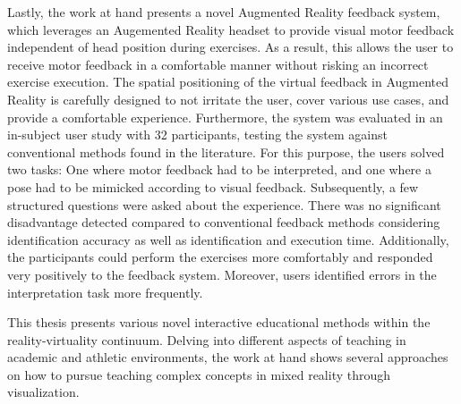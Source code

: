Lastly, the work at hand presents a novel Augmented Reality feedback system, which leverages an Augemented Reality headset to provide visual motor feedback independent of head position during exercises.
As a result, this allows the user to receive motor feedback in a comfortable manner without risking an incorrect exercise execution.
The spatial positioning of the virtual feedback in Augmented Reality is carefully designed to not irritate the user, cover various use cases, and provide a comfortable experience.
Furthermore, the system was evaluated in an in-subject user study with 32 participants, testing the system against conventional methods found in the literature.
For this purpose, the users solved two tasks: One where motor feedback had to be interpreted, and one where a pose had to be mimicked according to visual feedback.
Subsequently, a few structured questions were asked about the experience.
There was no significant disadvantage detected compared to conventional feedback methods considering identification accuracy as well as identification and execution time.
Additionally, the participants could perform the exercises more comfortably and responded very positively to the feedback system.
Moreover, users identified errors in the interpretation task more frequently.

This thesis presents various novel interactive educational methods within the reality-virtuality continuum.
Delving into different aspects of teaching in academic and athletic environments, the work at hand shows several approaches on how to pursue teaching complex concepts in mixed reality through visualization.
